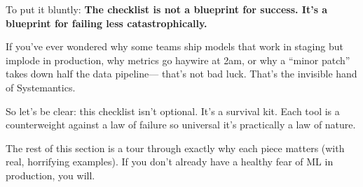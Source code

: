 To put it bluntly:  
\textbf{The checklist is not a blueprint for success. It’s a blueprint for failing less catastrophically.}

If you’ve ever wondered why some teams ship models that work in staging but implode in production,  
why metrics go haywire at 2am, or why a “minor patch” takes down half the data pipeline—  
that’s not bad luck. That’s the invisible hand of Systemantics.

So let’s be clear: this checklist isn’t optional. It’s a survival kit.  
Each tool is a counterweight against a law of failure so universal it’s practically a law of nature.

The rest of this section is a tour through exactly why each piece matters (with real, horrifying examples).  
If you don’t already have a healthy fear of ML in production, you will.
